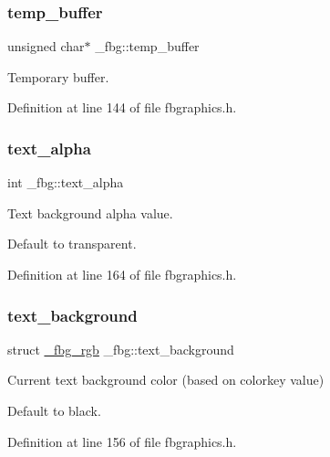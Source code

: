 \subsubsection{\texorpdfstring{temp\+\_\+buffer}{temp\_buffer}}
{\footnotesize\ttfamily unsigned char$\ast$ \+\_\+fbg\+::temp\+\_\+buffer}



Temporary buffer. 



Definition at line 144 of file fbgraphics.\+h.

\mbox{\label{struct__fbg_a870987786121c51135f20b630d731abd}} 
\subsubsection{\texorpdfstring{text\+\_\+alpha}{text\_alpha}}
{\footnotesize\ttfamily int \+\_\+fbg\+::text\+\_\+alpha}



Text background alpha value. 

Default to transparent. 

Definition at line 164 of file fbgraphics.\+h.

\mbox{\label{struct__fbg_afd34a8de5a853e915bd101f11d44cf67}} 
\subsubsection{\texorpdfstring{text\+\_\+background}{text\_background}}
{\footnotesize\ttfamily struct \mbox{\hyperlink{fbgraphics_8h_struct__fbg__rgb}{\+\_\+fbg\+\_\+rgb}} \+\_\+fbg\+::text\+\_\+background}



Current text background color (based on colorkey value) 

Default to black. 

Definition at line 156 of file fbgraphics.\+h.

\mbox{\label{struct__fbg_a4abb858439598b09790ec6d5d8326bb2}} 

